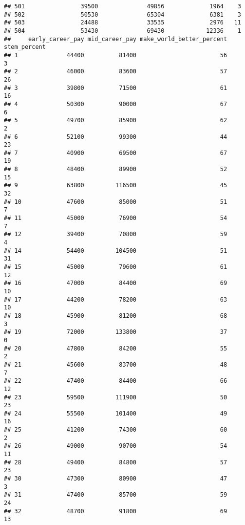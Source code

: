 \documentclass[
]{article}
\begin{document}
\begin{verbatim}
## 501                39500              49856             1964    3
## 502                50530              65304             6381    3
## 503                24488              33535             2976   11
## 504                53430              69430            12336    1
##     early_career_pay mid_career_pay make_world_better_percent stem_percent
## 1              44400          81400                        56            3
## 2              46000          83600                        57           26
## 3              39800          71500                        61           16
## 4              50300          90000                        67            6
## 5              49700          85900                        62            2
## 6              52100          99300                        44           23
## 7              40900          69500                        67           19
## 8              48400          89900                        52           15
## 9              63800         116500                        45           32
## 10             47600          85000                        51            7
## 11             45000          76900                        54            7
## 12             39400          70800                        59            4
## 14             54400         104500                        51           31
## 15             45000          79600                        61           12
## 16             47000          84400                        69           10
## 17             44200          78200                        63           10
## 18             45900          81200                        68            3
## 19             72000         133800                        37            0
## 20             47800          84200                        55            2
## 21             45600          83700                        48            7
## 22             47400          84400                        66           12
## 23             59500         111900                        50           23
## 24             55500         101400                        49           16
## 25             41200          74300                        60            2
## 26             49000          90700                        54           11
## 28             49400          84800                        57           23
## 30             47300          80900                        47            3
## 31             47400          85700                        59           24
## 32             48700          91800                        69           13

\end{verbatim}
\end{document}
